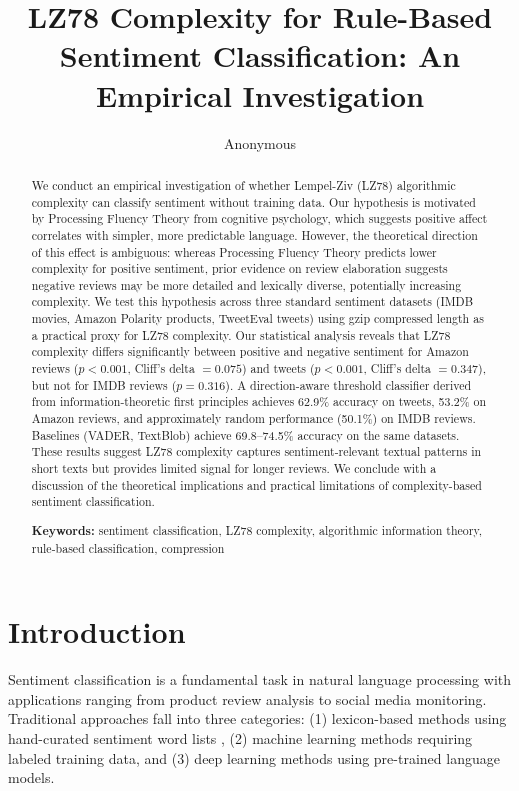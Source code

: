 \documentclass[11pt,letterpaper]{article}
\title{LZ78 Complexity for Rule-Based Sentiment Classification: An Empirical Investigation}
\author{Anonymous}
\date{}
\begin{document}
\maketitle

\begin{abstract}
We conduct an empirical investigation of whether Lempel-Ziv (LZ78) algorithmic complexity can classify sentiment without training data. Our hypothesis is motivated by Processing Fluency Theory from cognitive psychology, which suggests positive affect correlates with simpler, more predictable language. However, the theoretical direction of this effect is ambiguous: whereas Processing Fluency Theory predicts lower complexity for positive sentiment, prior evidence on review elaboration suggests negative reviews may be more detailed and lexically diverse, potentially increasing complexity. We test this hypothesis across three standard sentiment datasets (IMDB movies, Amazon Polarity products, TweetEval tweets) using gzip compressed length as a practical proxy for LZ78 complexity. Our statistical analysis reveals that LZ78 complexity differs significantly between positive and negative sentiment for Amazon reviews ($p < 0.001$, Cliff's delta $= 0.075$) and tweets ($p < 0.001$, Cliff's delta $= 0.347$), but not for IMDB reviews ($p = 0.316$). A direction-aware threshold classifier derived from information-theoretic first principles achieves 62.9\% accuracy on tweets, 53.2\% on Amazon reviews, and approximately random performance (50.1\%) on IMDB reviews. Baselines (VADER, TextBlob) achieve 69.8--74.5\% accuracy on the same datasets. These results suggest LZ78 complexity captures sentiment-relevant textual patterns in short texts but provides limited signal for longer reviews. We conclude with a discussion of the theoretical implications and practical limitations of complexity-based sentiment classification.

\vspace{0.5em}
\noindent\textbf{Keywords:} sentiment classification, LZ78 complexity, algorithmic information theory, rule-based classification, compression
\end{abstract}

\section{Introduction}

Sentiment classification is a fundamental task in natural language processing with applications ranging from product review analysis to social media monitoring. Traditional approaches fall into three categories: (1) lexicon-based methods using hand-curated sentiment word lists \cite{Hutto2014}, (2) machine learning methods requiring labeled training data, and (3) deep learning methods using pre-trained language models.
\end{document}
